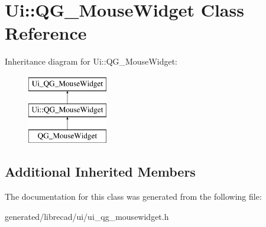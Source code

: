 \hypertarget{classUi_1_1QG__MouseWidget}{\section{Ui\-:\-:Q\-G\-\_\-\-Mouse\-Widget Class Reference}
\label{classUi_1_1QG__MouseWidget}
}
Inheritance diagram for Ui\-:\-:Q\-G\-\_\-\-Mouse\-Widget\-:\begin{figure}[H]
\begin{center}
\leavevmode
\includegraphics[height=3.000000cm]{classUi_1_1QG__MouseWidget}
\end{center}
\end{figure}
\subsection*{Additional Inherited Members}


The documentation for this class was generated from the following file\-:\begin{DoxyCompactItemize}
\item 
generated/librecad/ui/ui\-\_\-qg\-\_\-mousewidget.\-h\end{DoxyCompactItemize}
